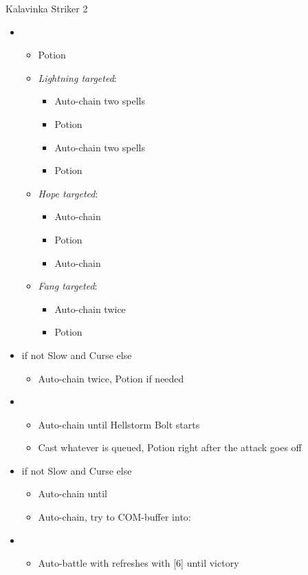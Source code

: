 \documentclass{report}
\begin{document}
\begin{battle}{Kalavinka Striker 2}
\begin{itemize}
    \item \first
    \begin{itemize}
        \item Potion
        \item \textit{Lightning targeted}:
        \begin{itemize}
            \item Auto-chain two spells
            \item Potion
            \item Auto-chain two spells
            \item Potion
        \end{itemize}
        \item \textit{Hope targeted}:
        \begin{itemize}
            \item Auto-chain
            \item Potion
            \item Auto-chain
        \end{itemize}
        \item \textit{Fang targeted}:
        \begin{itemize}
            \item Auto-chain twice
            \item Potion
        \end{itemize}
    \end{itemize}
    \item \second if not Slow and Curse else \fourth
    \begin{itemize}
        \item Auto-chain twice, Potion if needed
    \end{itemize}
    \item \third
    \begin{itemize}
        \item Auto-chain until Hellstorm Bolt starts
        \item Cast whatever is queued, Potion right after the attack goes off
    \end{itemize}
    \item \second if not Slow and Curse else \fourth
    \begin{itemize}
        \item Auto-chain until \stagger
        \item Auto-chain, try to COM-buffer into:
    \end{itemize}
    \item \fifth
    \begin{itemize}
        \item Auto-battle with refreshes with [6] until victory
    \end{itemize}
\end{itemize}
\end{battle}
\end{document}
